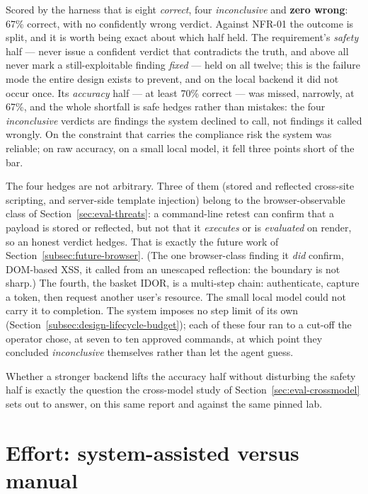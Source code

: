 Scored by the harness that is eight \emph{correct}, four \emph{inconclusive} and
\textbf{zero wrong}: 67\% correct, with no confidently wrong verdict. Against NFR-01
the outcome is split, and it is worth being exact about which half held. The
requirement's \emph{safety} half --- never issue a confident verdict that contradicts
the truth, and above all never mark a still-exploitable finding \emph{fixed} --- held
on all twelve; this is the failure mode the entire design exists to prevent, and on
the local backend it did not occur once. Its \emph{accuracy} half --- at least 70\%
correct --- was missed, narrowly, at 67\%, and the whole shortfall is safe hedges
rather than mistakes: the four \emph{inconclusive} verdicts are findings the system
declined to call, not findings it called wrongly. On the constraint that carries the
compliance risk the system was reliable; on raw accuracy, on a small local model, it
fell three points short of the bar.

The four hedges are not arbitrary. Three of them (stored and reflected cross-site
scripting, and server-side template injection) belong to the browser-observable class
of Section~\ref{sec:eval-threats}: a command-line retest can confirm that a payload is
stored or reflected, but not that it \emph{executes} or is \emph{evaluated} on render,
so an honest verdict hedges. That is exactly the future work of
Section~\ref{subsec:future-browser}. (The one browser-class finding it \emph{did}
confirm, DOM-based XSS, it called from an unescaped reflection: the boundary is not
sharp.) The fourth, the basket IDOR, is a multi-step chain: authenticate, capture a
token, then request another user's resource. The small local model could not carry it
to completion. The system imposes no step limit of its own
(Section~\ref{subsec:design-lifecycle-budget}); each of these four ran to a cut-off the
operator chose, at seven to ten approved commands, at which point they concluded
\emph{inconclusive} themselves rather than let the agent guess.

Whether a stronger backend lifts the accuracy half without disturbing the safety half
is exactly the question the cross-model study of Section~\ref{sec:eval-crossmodel} sets
out to answer, on this same report and against the same pinned lab.

\section{Effort: system-assisted versus manual}
\label{sec:eval-time}

